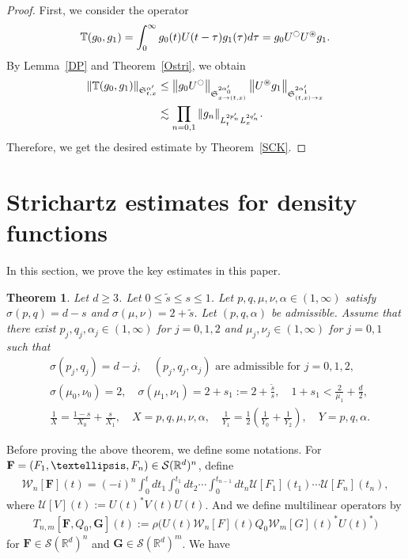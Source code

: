 \documentclass[10pt]{amsart}
\newtheorem{theo}{Theorem}[section]
\theoremstyle{definition}
\numberwithin{equation}{section}
\newcommand{\oast}{\circledast}
\newcommand{\BR}{\mathbb{R}}
\newcommand{\BT}{\mathbb{T}}
\newcommand{\vF}{{\mathbf{F}}}
\newcommand{\vG}{{\mathbf{G}}}
\newcommand{\CS}{\mathcal{S}}
\newcommand{\CU}{\mathcal{U}}
\newcommand{\CW}{\mathcal{W}}
\newcommand{\FS}{\mathfrak{S}}
\newcommand{\al}{\alpha}
\newcommand{\ta}{\tau}
\newcommand{\si}{\sigma}
\newcommand{\rh}{\rho}
\newcommand{\wt}{\widetilde}
\newcommand{\K}[1]{\left(#1\right)}
\newcommand{\I}{\infty}
\newcommand{\tx}{{t,x}}
\newcommand{\oc}{\ocircle}
\newcommand{\os}{\oast}
\newcommand{\ls}{\lesssim}
\begin{document}
\begin{proof}
First, we consider the operator
\begin{align}
\BT(g_0,g_1) = \int_0^\I g_0(t)U(t-\ta)g_1(\ta)d\ta = g_0 U^\oc U^\os g_1.
\end{align}
By Lemma~\ref{DP} and Theorem~\ref{Ostri}, we obtain
\begin{align}
\left\|\BT(g_0,g_1)\right\|_{\FS^{\al'}_{\tx}} &\le \left\|g_0 U^\oc\right\|_{\FS^{2\al_0'}_{x \to (\tx)}} \left\|U^\os g_1\right\|_{\FS^{2\al_1'}_{(\tx)\to x}} \\
&\ls \prod_{n=0,1} \|g_n\|_{L^{2p_n'}_t L^{2q_n'}_x}.
\end{align}
Therefore, we get the desired estimate by Theorem~\ref{SCK}.
\end{proof}
\section{Strichartz estimates for density functions}\label{sect4}

In this section, we prove the key estimates in this paper.
\begin{theo}\label{Key}
Let $d \ge 3$. Let $0 \le \wt{s} \le s \le 1$. Let $p,q,\mu,\nu,\al \in (1,\I)$ satisfy $\si(p,q)=d-s$ and $\si(\mu,\nu) = 2+\wt{s}$. Let $(p,q,\al)$ be admissible. Assume that there exist $p_j,q_j,\al_j \in (1,\I)$ for $j=0,1,2$ and $\mu_j,\nu_j \in (1,\I)$ for $j=0,1$ such that
\begin{align}
&\si(p_j,q_j) = d-j,\quad (p_j,q_j,\al_j) \text{ are admissible for } j=0,1,2, \\
&\si(\mu_0,\nu_0) = 2, \quad \si (\mu_1,\nu_1) = 2+s_1 := 2 + \frac{\wt{s}}{s}, \quad 1+s_1 < \frac{2}{\mu_1}+\frac{d}{2},\\
&\frac{1}{X} = \frac{1-s}{X_0} + \frac{s}{X_1}, \quad X = p,q,\mu,\nu,\al,
\quad \frac{1}{Y_1} = \frac{1}{2} \K{\frac{1}{Y_0} + \frac{1}{Y_2}}, \quad Y=p,q,\al.
\end{align}
\end{theo}
\setcounter{theo}{2}
\setcounter{equation}{10}
Before proving the above theorem, we define some notations. For $\vF=(F_1,\dots, F_n) \linebreak\in \CS(\BR^d)^n$, define
\begin{align}
\CW_n [\vF](t) = (-i)^n \int_0^t dt_1 \int_0^{t_1} dt_2 \cdots \int_0^{t_{n-1}} dt_n
\CU[F_1](t_1) \cdots \CU[F_n](t_n),
\end{align}
where $\CU[V](t):= U(t)^*V(t)U(t)$. And we define multilinear operators by
\begin{align}
T_{n,m}[\vF,Q_0, \vG](t) := \rh \big( U(t)\CW_n[F](t) Q_0 \CW_m [G](t)^* U(t)^* \big)
\end{align}
for $\vF \in \CS(\BR^d)^n$ and $\vG \in \CS(\BR^d)^m$. We have
\end{document}
